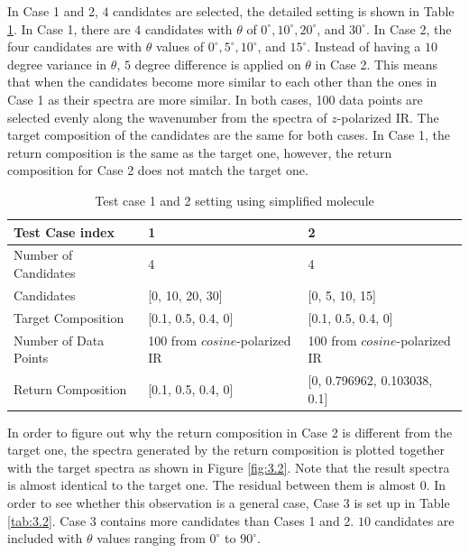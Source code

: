 In Case 1 and 2, $4$ candidates are selected, the detailed setting is shown in Table \ref{tab:3.1}. In Case 1, there are $4$ candidates with $\theta$ of $0^{\circ}, 10^{\circ}, 20^{\circ}$, and $30^{\circ}$. In Case 2, the four candidates are with $\theta$ values of $0^{\circ}, 5^{\circ}, 10^{\circ}$, and $15^{\circ}$. Instead of having a $10$ degree variance in $\theta$, $5$ degree difference is applied on $\theta$ in Case 2. This means that when the candidates become more similar to each other than the ones in Case 1 as their spectra are more similar. In both cases, 100 data points are selected evenly along the wavenumber from the spectra of $z$-polarized IR. The target composition of the candidates are the same for both cases. In Case 1, the return composition is the same as the target one, however, the return composition for Case 2 does not match the target one. \\

\begin{table} 
\begin{center}
\begin{tabular}{| l | l | l | }
\hline
Test Case index & 1 & 2  \\
\hline
Number of Candidates & 4 & 4  \\
\hline
Candidates & [0, 10, 20, 30] & [0, 5, 10, 15] \\
\hline
Target Composition & [0.1, 0.5, 0.4, 0] & [0.1, 0.5, 0.4, 0]     \\
\hline
Number of Data Points & 100 from $cosine$-polarized IR &  100 from $cosine$-polarized IR     \\
\hline
Return Composition & [0.1, 0.5, 0.4, 0] & [0, 0.796962, 0.103038, 0.1] \\
\hline
\end{tabular} 
\end{center}
\caption{Test case 1 and 2 setting using simplified molecule}
\label{tab:3.1}
\end{table}	

In order to figure out why the return composition in Case 2 is different from the target one, the spectra generated by the return composition is plotted together with the target spectra as shown in Figure \ref{fig:3.2}. Note that the result spectra is almost identical to the target one. The residual between them is almost $0$. In order to see whether this observation is a general case, Case 3 is set up in Table \ref{tab:3.2}. Case 3 contains more candidates than Cases 1 and 2. $10$ candidates are included with $\theta$ values ranging from $0^{\circ}$ to $90^{\circ}$.  \\


